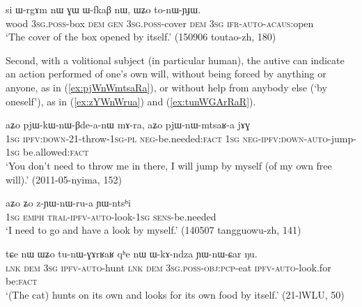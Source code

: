 \begin{exe}
\ex \label{ex:WZo.tonWYJW}
\gll si ɯ-rgɤm nɯ ɣɯ ɯ-fkaβ nɯ, ɯʑo to-nɯ-ɲɟɯ.  \\
wood \textsc{3sg}.\textsc{poss}-box \textsc{dem} \textsc{gen} \textsc{3sg}.\textsc{poss}-cover \textsc{dem} \textsc{3sg} \textsc{ifr}-\textsc{auto}-\textsc{acaus}:open \\
\glt `The cover of the box opened by itself.' (150906 toutao-zh, 180)
\end{exe}

Second, with a volitional subject (in particular human), the autive can indicate an action performed of one's own will, without being forced by anything or anyone, as in (\ref{ex:pjWnWmtsaRa}), or without help from anybody else (`by oneself'), as in (\ref{ex:zYWnWrua}) and (\ref{ex:tunWGArRaR}).

\begin{exe}
\ex \label{ex:pjWnWmtsaRa}
\gll  aʑo pjɯ-kɯ-nɯ-βde-a-nɯ mɤ-ra, aʑo pjɯ-nɯ-mtsaʁ-a jɤɣ \\
\textsc{1sg} \textsc{ipfv}:\textsc{down}-2\fl{}1-throw-\textsc{1sg}-\textsc{pl} \textsc{neg}-be.needed:\textsc{fact} \textsc{1sg} \textsc{neg}-\textsc{ipfv}:\textsc{down}-\textsc{auto}-jump-\textsc{1sg} be.allowed:\textsc{fact} \\
\glt `You don't need to throw me in there, I will jump by myself (of my own free will).' (2011-05-nyima, 152)
\end{exe}

\begin{exe}
\ex \label{ex:zYWnWrua}
\gll aʑo ʑo z-ɲɯ-nɯ-ru-a ɲɯ-ntsʰi \\
\textsc{1sg} \textsc{emph} \textsc{tral}-\textsc{ipfv}-\textsc{auto}-look-\textsc{1sg} \textsc{sens}-be.needed \\
\glt `I need to go and have a look by myself.' (140507 tangguowu-zh, 141)
\end{exe} 

\begin{exe}
	\ex \label{ex:tunWGArRaR}
	\gll tɕe nɯ ɯʑo tu-nɯ-ɣɤrʁaʁ qʰe nɯ ɯ-kɤ-ndza ɲɯ-nɯ-ɕar ŋu. \\
	\textsc{lnk} \textsc{dem} \textsc{3sg} \textsc{ipfv}-\textsc{auto}-hunt \textsc{lnk} \textsc{dem} \textsc{3sg}.\textsc{poss}-\textsc{obj}:\textsc{pcp}-eat \textsc{ipfv}-\textsc{auto}-look.for be:\textsc{fact} \\
	\glt `(The cat) hunts on its own and looks for its own food by itself.' (21-lWLU, 50)
\end{exe} 


